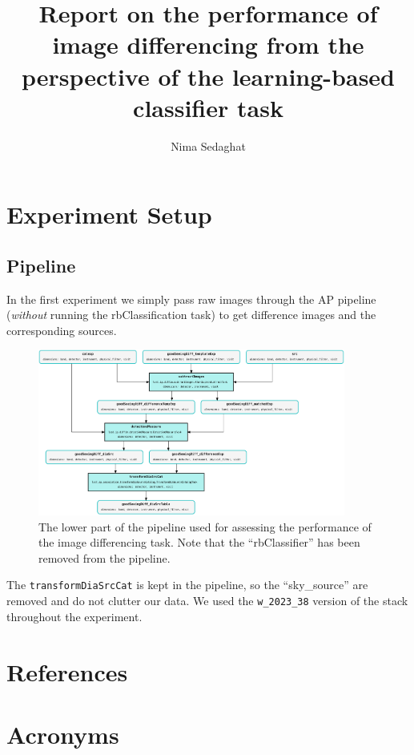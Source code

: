 \documentclass[DM,authoryear,toc]{lsstdoc}
\title{Report on the performance of image differencing from the perspective of the learning-based classifier task}
\author{%
Nima Sedaghat
}
\date{\vcsDate}
\begin{document}
\maketitle


\section{Experiment Setup}
\subsection{Pipeline}
In the first experiment we simply pass raw images through the AP pipeline (\emph{without} running the rbClassification task) to get difference images and the corresponding sources.

\begin{figure}[h]
  \centering
  \includegraphics[width=0.9\textwidth]{pipeline.png}
  \caption{The lower part of the pipeline used for assessing the performance of the image differencing task. Note that the ``rbClassifier'' has been removed from the pipeline.}
  \label{fig:exposure_hist}
\end{figure}

The \texttt{transformDiaSrcCat} is kept in the pipeline, so the ``sky\_source'' are removed and do not clutter our data.
We used the \texttt{w\_2023\_38} version of the stack throughout the experiment.





\appendix
\section{References} \label{sec:bib}
\renewcommand{\refname}{} %


\section{Acronyms} \label{sec:acronyms}

\end{document}
